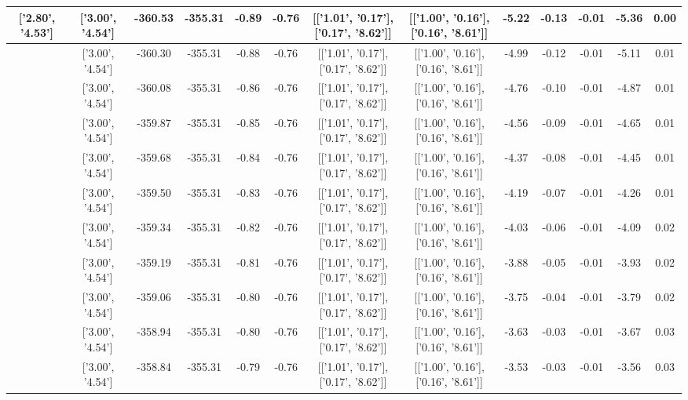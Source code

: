 \begin{table}[htbp]
\begin{adjustbox}{angle=90}
\begin{tabular}{|c|c|c|c|c|c|c|c|c|c|c|c|c|}
 ['2.80', '4.53'] & ['3.00', '4.54'] & -360.53 & -355.31 & -0.89 & -0.76 & [['1.01', '0.17'], ['0.17', '8.62']] & [['1.00', '0.16'], ['0.16', '8.61']] & -5.22 & -0.13 & -0.01 & -5.36 & 0.00\\ \hline
 ['2.81', '4.53'] & ['3.00', '4.54'] & -360.30 & -355.31 & -0.88 & -0.76 & [['1.01', '0.17'], ['0.17', '8.62']] & [['1.00', '0.16'], ['0.16', '8.61']] & -4.99 & -0.12 & -0.01 & -5.11 & 0.01\\ \hline
 ['2.83', '4.53'] & ['3.00', '4.54'] & -360.08 & -355.31 & -0.86 & -0.76 & [['1.01', '0.17'], ['0.17', '8.62']] & [['1.00', '0.16'], ['0.16', '8.61']] & -4.76 & -0.10 & -0.01 & -4.87 & 0.01\\ \hline
 ['2.84', '4.53'] & ['3.00', '4.54'] & -359.87 & -355.31 & -0.85 & -0.76 & [['1.01', '0.17'], ['0.17', '8.62']] & [['1.00', '0.16'], ['0.16', '8.61']] & -4.56 & -0.09 & -0.01 & -4.65 & 0.01\\ \hline
 ['2.85', '4.53'] & ['3.00', '4.54'] & -359.68 & -355.31 & -0.84 & -0.76 & [['1.01', '0.17'], ['0.17', '8.62']] & [['1.00', '0.16'], ['0.16', '8.61']] & -4.37 & -0.08 & -0.01 & -4.45 & 0.01\\ \hline
 ['2.86', '4.53'] & ['3.00', '4.54'] & -359.50 & -355.31 & -0.83 & -0.76 & [['1.01', '0.17'], ['0.17', '8.62']] & [['1.00', '0.16'], ['0.16', '8.61']] & -4.19 & -0.07 & -0.01 & -4.26 & 0.01\\ \hline
 ['2.87', '4.53'] & ['3.00', '4.54'] & -359.34 & -355.31 & -0.82 & -0.76 & [['1.01', '0.17'], ['0.17', '8.62']] & [['1.00', '0.16'], ['0.16', '8.61']] & -4.03 & -0.06 & -0.01 & -4.09 & 0.02\\ \hline
 ['2.89', '4.53'] & ['3.00', '4.54'] & -359.19 & -355.31 & -0.81 & -0.76 & [['1.01', '0.17'], ['0.17', '8.62']] & [['1.00', '0.16'], ['0.16', '8.61']] & -3.88 & -0.05 & -0.01 & -3.93 & 0.02\\ \hline
 ['2.90', '4.53'] & ['3.00', '4.54'] & -359.06 & -355.31 & -0.80 & -0.76 & [['1.01', '0.17'], ['0.17', '8.62']] & [['1.00', '0.16'], ['0.16', '8.61']] & -3.75 & -0.04 & -0.01 & -3.79 & 0.02\\ \hline
 ['2.91', '4.53'] & ['3.00', '4.54'] & -358.94 & -355.31 & -0.80 & -0.76 & [['1.01', '0.17'], ['0.17', '8.62']] & [['1.00', '0.16'], ['0.16', '8.61']] & -3.63 & -0.03 & -0.01 & -3.67 & 0.03\\ \hline
 ['2.92', '4.53'] & ['3.00', '4.54'] & -358.84 & -355.31 & -0.79 & -0.76 & [['1.01', '0.17'], ['0.17', '8.62']] & [['1.00', '0.16'], ['0.16', '8.61']] & -3.53 & -0.03 & -0.01 & -3.56 & 0.03\\ \hline

\end{tabular}
\end{adjustbox}
\end{table}
